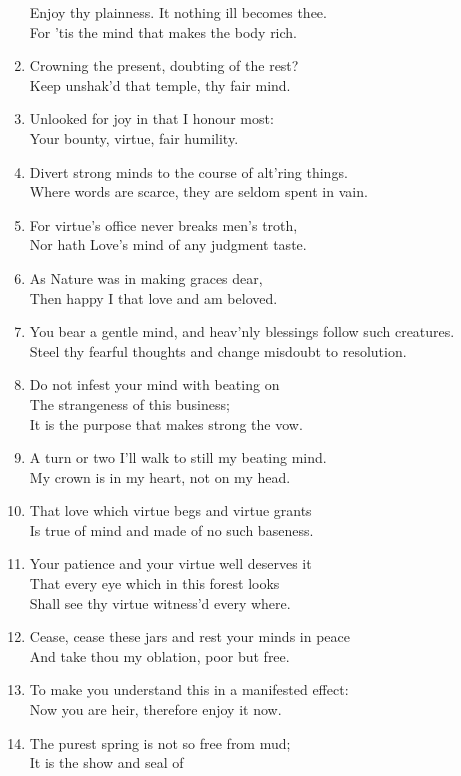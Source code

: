 \documentclass[17pt]{extarticle}
\begin{document}
\begin{enumerate}
  Enjoy thy plainness. It nothing ill becomes thee.\\For 'tis the mind
  that makes the body rich.
\item
  Crowning the present, doubting of the rest?\\Keep unshak'd that
  temple, thy fair mind.
\item
  Unlooked for joy in that I honour most:\\Your bounty, virtue, fair
  humility.
\item
  Divert strong minds to the course of alt'ring things.\\Where words are
  scarce, they are seldom spent in vain.
\item
  For virtue's office never breaks men's troth,\\Nor hath Love's mind of
  any judgment taste.
\item
  As Nature was in making graces dear,\\Then happy I that love and am
  beloved.
\item
  You bear a gentle mind, and heav'nly blessings follow such
  creatures.\\Steel thy fearful thoughts and change misdoubt to
  resolution.
\item
  Do not infest your mind with beating on\\The strangeness of this
  business;\\It is the purpose that makes strong the vow.
\item
  A turn or two I'll walk to still my beating mind.\\My crown is in my
  heart, not on my head.
\item
  That love which virtue begs and virtue grants\\Is true of mind and
  made of no such baseness.
\item
  Your patience and your virtue well deserves it\\That every eye which
  in this forest looks\\Shall see thy virtue witness'd every where.
\item
  Cease, cease these jars and rest your minds in peace\\And take thou my
  oblation, poor but free.
\item
  To make you understand this in a manifested effect:\\Now you are heir,
  therefore enjoy it now.
\item
  The purest spring is not so free from mud;\\It is the show and seal of

\end{enumerate}
\end{document}
